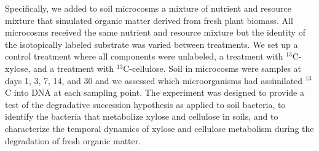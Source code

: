 Specifically, we added to soil microcosms a mixture of nutrient and resource
mixture that simulated organic matter derived from fresh plant biomass. All
microcosms received the same nutrient and resource mixture but the identity of
the isotopically labeled substrate was varied between treatments. We set up
a control treatment where all components were unlabeled, a treatment with
$^{13}$C-xylose, and a treatment with $^{13}$C-cellulose. Soil in microcosms
were samples at days 1, 3, 7, 14, and 30 and we assessed which microorganisms
had assimilated $^{13}$C into DNA at each sampling point. The experiment was
designed to provide a test of the degradative succession hypothesis as applied
to soil bacteria, to identify the bacteria that metabolize xylose and cellulose
in soils, and to characterize the temporal dynamics of xylose and cellulose
metabolism during the degradation of fresh organic matter. 

